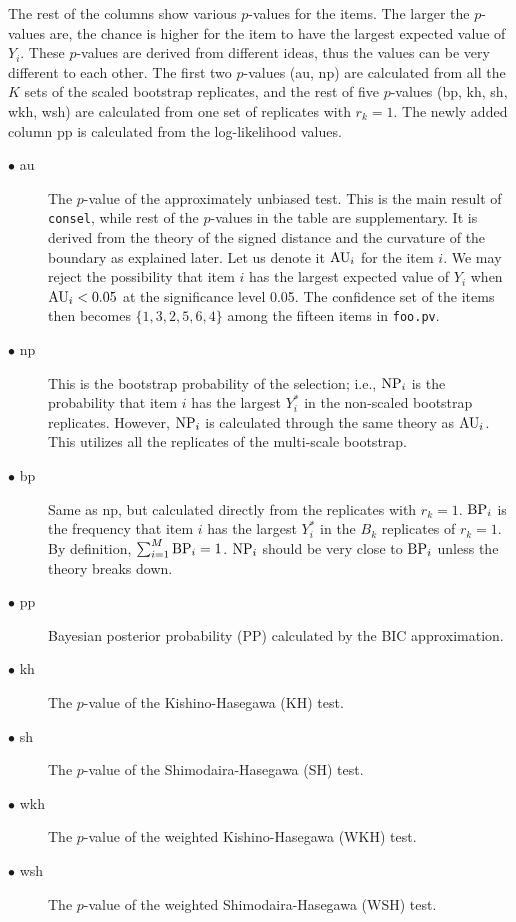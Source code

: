 \documentclass[12pt]{article}
\begin{document}
The rest of the columns show various $p$-values for the items.  The
larger the $p$-values are, the chance is higher for the item to have the
largest expected value of $Y_i$. These $p$-values are derived from
different ideas, thus the values can be very different to each other.
The first two $p$-values (au, np) are calculated from all the $K$ sets
of the scaled bootstrap replicates, and the rest of five $p$-values
(bp, kh, sh, wkh, wsh) are calculated from one set of replicates with
$r_k=1$. The newly added column pp is calculated from the log-likelihood
values.

\begin{description}
 \item[$\bullet$ au] The $p$-value of the approximately unbiased
	    test. This is the main result of {\tt consel}, while rest of
	    the $p$-values in the table are supplementary.  It is
	    derived from the theory of the signed distance and the
	    curvature of the boundary as explained later.  Let us denote
	    it ${\rm AU}_i$ for the item $i$. We may reject the
	    possibility that item $i$ has the largest expected value of
	    $Y_i$ when ${\rm AU}_i < 0.05$ at the significance level
	    0.05. The confidence set of the items then becomes $\{1,3,2,
	    5,6,4 \}$ among the fifteen items in {\tt foo.pv}.
 \item[$\bullet$ np] This is the bootstrap probability of the selection;
	    i.e., ${\rm NP}_i$ is the probability that item $i$ has the
	    largest $Y^*_i$ in the non-scaled bootstrap replicates.
	    However, ${\rm NP}_i$ is calculated through the same theory
	    as ${\rm AU}_i$.  This utilizes all the replicates of the
	    multi-scale bootstrap.
 \item[$\bullet$ bp] Same as np, but calculated directly from the
	    replicates with $r_k=1$. ${\rm BP}_i$ is the frequency
	    that item $i$ has the largest $Y^*_i$ in the $B_k$
	    replicates of $r_k=1$. By definition, $\sum_{i=1}^M
	    {\rm BP}_i = 1$. ${\rm NP}_i $ should be very close to
	    ${\rm BP}_i$ unless the theory breaks down.
 \item[$\bullet$ pp] Bayesian posterior probability (PP) calculated by
	    the BIC approximation.
 \item[$\bullet$ kh] The $p$-value of the Kishino-Hasegawa (KH) test.
 \item[$\bullet$ sh] The $p$-value of the Shimodaira-Hasegawa (SH) test.
 \item[$\bullet$ wkh] The $p$-value of the weighted Kishino-Hasegawa
	    (WKH) test.
 \item[$\bullet$ wsh] The $p$-value of the weighted Shimodaira-Hasegawa
	    (WSH) test.
\end{description}
\end{document}
